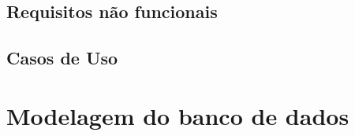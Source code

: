 \subsection{Requisitos não funcionais}

\subsection{Casos de Uso}

\section{Modelagem do banco de dados}
